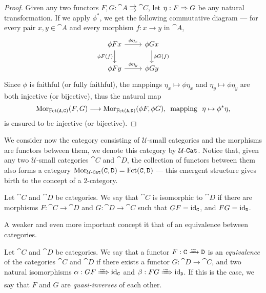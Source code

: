 \begin{proof}
    Given any two functors \(F, G: \cat A \rightrightarrows \cat C\), let \(\eta: F
    \Rightarrow G\) be any natural transformation. If we apply \(\phi^{*}\), we get the
    following commutative diagram --- for every pair \(x, y \in \cat A\) and every
    morphism \(f: x \to y\) in \(\cat A\),
    \[
        \begin{tikzcd}
            \phi F x \ar[r, "\phi \eta_x"] \ar[d, swap, "\phi F(f)"]
            &\phi G x \ar[d, "\phi G(f)"] \\
            \phi F y \ar[r, "\phi \eta_y"]
            &\phi G y
        \end{tikzcd}
    \]
    Since \(\phi\) is faithful (or fully faithful), the mappings \(\eta_x \mapsto
    \phi \eta_x\) and \(\eta_y \mapsto \phi \eta_y\) are both injective (or
    bijective), thus the natural map
    \[
        \operatorname{Mor}_{\operatorname{Fct}(\texttt A, \texttt C)}(F, G) \longrightarrow
        \operatorname{Mor}_{\operatorname{Fct}(\texttt A, \texttt D)}(\phi F, \phi G)\text{,}
        \ \text{ mapping }\ \eta \mapsto \phi^{*} \eta,
    \]
    is ensured to be injective (or bijective).
\end{proof}

We consider now the category consisting of \(\mathcal U\)-small categories and
the morphisms are functors between them, we denote this category by
\({\mathcal{U}\text{-}\texttt{Cat}}\). Notice that, given any two \(\mathcal U\)-small categories \(\cat C\)
and \(\cat D\), the collection of functors between them also forms a category
\(\operatorname{Mor}_{{\mathcal{U}\text{-}\texttt{Cat}}}(\texttt C, \texttt D) = \operatorname{Fct}(\texttt C, \texttt D)\) --- this emergent
structure gives birth to the concept of a \(2\)-category.

\begin{definition}
    \label{def:isomorphism-categories}
    Let \(\cat C\) and \(\cat D\) be categories. We say that \(\cat C\) is
    isomorphic to \(\cat D\) if there are morphisms \(F: \cat C \to \cat D\) and
    \(G: \cat D \to \cat C\) such that \(GF = \operatorname{id}_{\texttt C}\), and \(FG = \operatorname{id}_{\texttt
        D}\).
\end{definition}

A weaker and even more important concept it that of an equivalence between
categories.

\begin{definition}
    \label{def:equivalence-categories}
    Let \(\cat C\) and \(\cat D\) be categories. We say that a functor
    \(F: \cat C \isoto \cat D\) is an \emph{equivalence} of the categories
    \(\cat C\) and \(\cat D\) if there exists a functor \(G: \cat D \to \cat C\), and
    two natural isomorphisms \(\alpha: G F \isonat \Id_{\cat C}\) and
    \(\beta: F G \isonat \Id_{\cat D}\). If this is the case, we say that \(F\) and
    \(G\) are \emph{quasi-inverses} of each other.
\end{definition}

